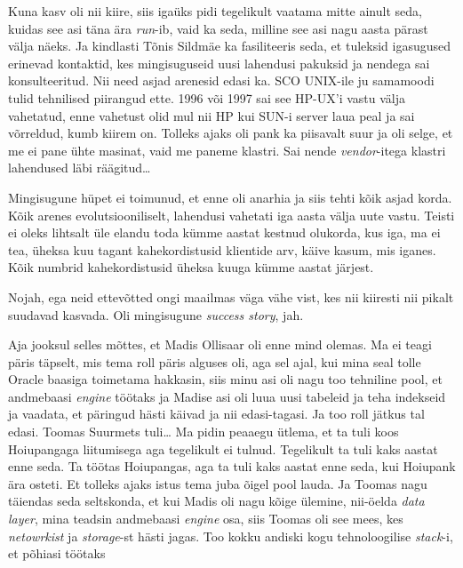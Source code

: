 Kuna  kasv oli nii kiire, siis igaüks pidi tegelikult vaatama  mitte ainult seda, kuidas see asi täna ära \emph{run}-ib, vaid ka seda, milline see asi nagu aasta pärast välja näeks. Ja kindlasti Tõnis Sildmäe ka fasiliteeris seda, et tuleksid igasugused erinevad kontaktid, kes mingisuguseid uusi lahendusi pakuksid ja nendega sai konsulteeritud. Nii need asjad arenesid edasi ka. SCO UNIX-ile ju samamoodi  tulid tehnilised piirangud ette. 1996 või 1997 sai see HP-UX'i vastu välja vahetatud, enne vahetust olid mul nii HP kui SUN-i server laua peal ja sai võrreldud, kumb  kiirem on. Tolleks ajaks oli pank ka piisavalt suur ja oli selge, et me  ei pane ühte masinat, vaid me paneme klastri. Sai nende \emph{vendor}-itega  klastri lahendused läbi räägitud\ldots

Mingisugune hüpet ei toimunud, et enne oli anarhia ja siis  tehti kõik asjad korda. Kõik arenes evolutsiooniliselt, lahendusi vahetati iga aasta välja uute vastu. Teisti ei oleks lihtsalt üle elandu toda kümme aastat kestnud olukorda, kus iga, ma ei tea, üheksa kuu tagant  kahekordistusid klientide arv, käive kasum, mis iganes. Kõik numbrid kahekordistusid üheksa kuuga kümme aastat järjest.


Nojah, ega neid ettevõtted ongi maailmas väga vähe vist, kes nii kiiresti nii pikalt suudavad kasvada. Oli mingisugune \emph{success story}, jah.


Aja jooksul selles mõttes, et Madis Ollisaar oli enne mind olemas. Ma ei teagi päris täpselt, mis tema roll päris alguses oli, aga sel ajal, kui mina seal tolle Oracle baasiga toimetama hakkasin, siis minu asi oli nagu too tehniline pool, et andmebaasi \emph{engine} töötaks ja Madise asi oli luua uusi tabeleid ja teha indekseid ja vaadata, et päringud hästi käivad ja nii edasi-tagasi. Ja too roll jätkus tal edasi. Toomas Suurmets tuli\ldots
Ma pidin peaaegu ütlema, et ta tuli koos Hoiupangaga liitumisega aga tegelikult ei tulnud. Tegelikult ta tuli kaks aastat enne seda. Ta töötas Hoiupangas, aga ta tuli kaks aastat enne seda, kui Hoiupank ära osteti. Et tolleks ajaks istus tema juba õigel pool lauda. Ja Toomas  nagu täiendas seda seltskonda, et kui Madis oli nagu kõige ülemine, nii-öelda \emph{data layer}, mina teadsin andmebaasi \emph{engine} osa, siis Toomas oli see mees, kes \emph{netowrkist} ja \emph{storage}-st hästi jagas.  Too kokku andiski kogu tehnoloogilise \emph{stack}-i, et põhiasi töötaks

